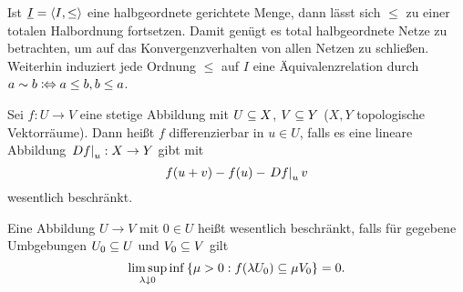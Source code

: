 \documentclass{book}
\begin{document}
\begin{remark}
    Ist $\uI=\struct{I,\leq}$ eine halbgeordnete gerichtete Menge, dann lässt sich $\leq$ zu einer totalen Halbordnung fortsetzen. Damit genügt es total halbgeordnete Netze zu betrachten, um auf das Konvergenzverhalten von allen Netzen zu schließen.
    Weiterhin induziert jede Ordnung $\leq$ auf $I$ eine Äquivalenzrelation durch $a\sim b\mathrel{\mathrel{\mathop:}\mkern-1.2mu\Leftrightarrow} a\leq b,b\leq a$.
\end{remark}

\begin{definition}
    Sei $f:U\to V$ eine stetige Abbildung mit $U\subseteq X$, $V\subseteq Y$ ($X,Y$ topologische Vektorräume).
    Dann heißt $f$ differenzierbar in $u\in U$, falls es eine lineare Abbildung $\left. Df\right\vert_{u}:X\rightarrow Y$ gibt mit
    $$
    f(u+v)-f(u)-\left. Df\right\vert_u v
    $$
    wesentlich beschränkt.
\end{definition}

Eine Abbildung $U\to V$ mit $0\in U$ heißt wesentlich beschränkt, falls für gegebene Umbgebungen $U_0\subseteq U$ und $V_0\subseteq V$ gilt
$$
\limsup_{\lambda\downto 0}{\inf\set{\mu>0:f(\lambda U_0)\setleq \mu V_0}}=0.
$$
\end{document}
